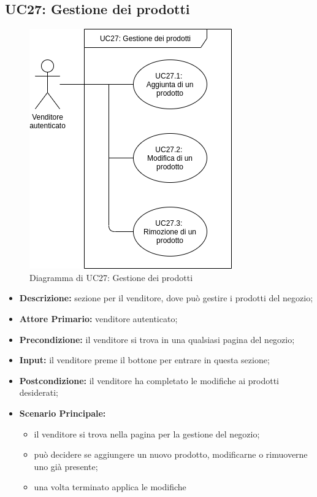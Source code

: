 \subsection{UC27: Gestione dei prodotti}
        \label{sec:UC27}
        \begin{figure}[!ht]
            \caption{Diagramma di UC27: Gestione dei prodotti}
            \vspace{10px}
            \includegraphics[scale=0.5]{../../../Images/AnalisiRequisiti/UC27}
            \centering
        \end{figure}
        \begin{itemize}
            \item \textbf{Descrizione:} sezione per il venditore, dove può gestire i prodotti del negozio;
            \item \textbf{Attore Primario:} venditore autenticato;
            \item \textbf{Precondizione:} il venditore si trova in una qualsiasi pagina del negozio;
            \item \textbf{Input:} il venditore preme il bottone per entrare in questa sezione;
            \item \textbf{Postcondizione:} il venditore ha completato le modifiche ai prodotti desiderati;
            \item \textbf{Scenario Principale:} 
                \begin{itemize}
                    \item il venditore si trova nella pagina per la gestione del negozio;
                    \item può decidere se aggiungere un nuovo prodotto, modificarne o rimuoverne uno già presente;
                    \item una volta terminato applica le modifiche
                \end{itemize}
        \end{itemize}
